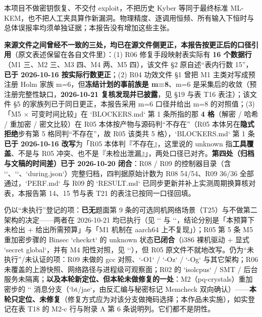 \documentclass[UTF8,fontset=fandol,11pt,a4paper]{ctexart}
\begin{document}
本项目不做密钥恢复、不交付 exploit，不把历史 Kyber 等同于最终标准 ML-KEM，也不把人工夹具算作新漏洞。物理精度、逐调用恒频、所有输入下恒时与总体误报率均须单独证据；本报告没有增加这些主张。


\textbf{来源文件之间曾经不一致的三处，均已在源文件侧更正，本报告按更正后的口径引用}（原文表述保留在各自文件里）：(1) R06 修复手段映射表实际有 \textbf{16 个数据行}（M1 三、M2 三、M3 四、M4 两、M5 四），该文件 §2 原自述“表内行数 15”，\textbf{已于 2026-10-16 按实际行数更正}；(2) R04 功效文件 §1 曾把 M1 主类对写成预注册 Holm 家族 m=6，但\textbf{冻结计划的事前族是 m=8}、m=6 是采集后的收敛（预注册完整性缺口，\textbf{2026-10-21 复核发现并已披露}，见 §19 与表 T16 表注）；该文件 §5 的家族列已于同日更正，本报告采用 m=6 口径并给出 m=8 的对照值；(3) 「M5 \texorpdfstring{$\times$}{x} 可变时间比较」在 `BLOCKERS.md` 第 1 条所指的那 \textbf{4 格}（解密 / 哈希 / 重加密 / 密文比较）在 R05 本体按产物与源码判“不存在”（R05 本体另在\textbf{隐式拒绝}步有第 5 格同判“不存在”，故 R05 该类共 5 格），`BLOCKERS.md` 第 1 条\textbf{已于 2026-10-16 改写}为「R05 本体判『不存在』，这里说的 unknown 指\textbf{工具覆盖}、不是与 R05 冲突、也不是『未检出泄漏』」，两处口径已对齐。\textbf{第四处（归档与文稿的时间差）已于 2026-10-20 闭合}：R08 / R09 的控制器目录（含 `\texttt{}`、`\texttt{}`、`during.json`）完整归档，四判据原始计数为 R08 54/54、R09 36/36 全部通过，`PERF.md` 与 R09 的 `RESULT.md` 已同步更新并补上实测周期换算核对表，本报告第 14、15 节与表 T21 的表注已按同一口径回填。


仍以“未执行”登记的项：\textbf{已无}题面第 9 条的可选同机网络场景（T25）与不做第二架构的决定——两者在 2026-10-21 均已执行（见 `\texttt{}` 与 `\texttt{}`，结论分别是「本预算下未检出 + 给出所需预算」与「M1 机制在 aarch64 上不复现」）；R05 第 5 条 M5 重加密步骤的 Binsec `checkct` 的 unknown 状态\textbf{已闭合}（i386 裸机驱动 + 显式 `secret global`，并有 M4 阳性对照，见 `\texttt{}`），但 R05 原文件不就地改写。仍为“未执行”/未认证的项：R09 未做的 gcc 对照、`-O1` / `-Oz` / `-Og` 与其它架构；R06 未覆盖的上游快照、网络路径与进程级可观察面；R02 的 `isolcpus` / SMT / 后台服务未隔离；\textbf{以及本轮新定位、但本轮未做修复的一处}：M2（pq-crystals）重加密步的 `\texttt{}` 消息分支（`bt/jae`，由反汇编与秘密标记 Memcheck 双向确认）——\textbf{本轮只定位、未修复}（修复方式应为对该分支做掩码选择；本作品未实施），如实登记在表 T18 的 M2-c 行与附录 A 第 6 条说明列。它们都不是阴性。
\end{document}
